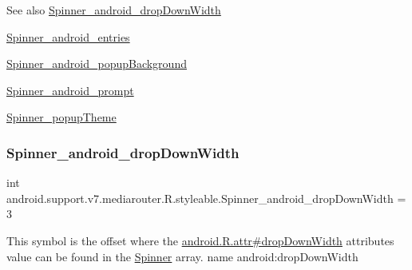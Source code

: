\begin{DoxySeeAlso}{See also}
\hyperlink{classandroid_1_1support_1_1v7_1_1mediarouter_1_1R_1_1styleable_ada50bd28e8330a67162fad2ff9914162}{Spinner\+\_\+android\+\_\+drop\+Down\+Width} 

\hyperlink{classandroid_1_1support_1_1v7_1_1mediarouter_1_1R_1_1styleable_a5d540e7f1f03b94e5f052572d1221d5d}{Spinner\+\_\+android\+\_\+entries} 

\hyperlink{classandroid_1_1support_1_1v7_1_1mediarouter_1_1R_1_1styleable_aea757797202520a71cc660bcc5f29e00}{Spinner\+\_\+android\+\_\+popup\+Background} 

\hyperlink{classandroid_1_1support_1_1v7_1_1mediarouter_1_1R_1_1styleable_aefc5f8f841d0a3444bacf4b203f30ade}{Spinner\+\_\+android\+\_\+prompt} 

\hyperlink{classandroid_1_1support_1_1v7_1_1mediarouter_1_1R_1_1styleable_a9e887ce78259fc5079eb2c603b3ac56f}{Spinner\+\_\+popup\+Theme} 
\end{DoxySeeAlso}
\mbox{\label{classandroid_1_1support_1_1v7_1_1mediarouter_1_1R_1_1styleable_ada50bd28e8330a67162fad2ff9914162}} 
\subsubsection{\texorpdfstring{Spinner\+\_\+android\+\_\+drop\+Down\+Width}{Spinner\_android\_dropDownWidth}}
{\footnotesize\ttfamily int android.\+support.\+v7.\+mediarouter.\+R.\+styleable.\+Spinner\+\_\+android\+\_\+drop\+Down\+Width = 3\hspace{0.3cm}{\ttfamily [static]}}

This symbol is the offset where the \hyperlink{}{android.\+R.\+attr\#drop\+Down\+Width} attribute\textquotesingle{}s value can be found in the \hyperlink{classandroid_1_1support_1_1v7_1_1mediarouter_1_1R_1_1styleable_adb75721ed5a18e76fcd9c38619ce0ac5}{Spinner} array.  name android\+:drop\+Down\+Width \mbox{\label{classandroid_1_1support_1_1v7_1_1mediarouter_1_1R_1_1styleable_a5d540e7f1f03b94e5f052572d1221d5d}} 
